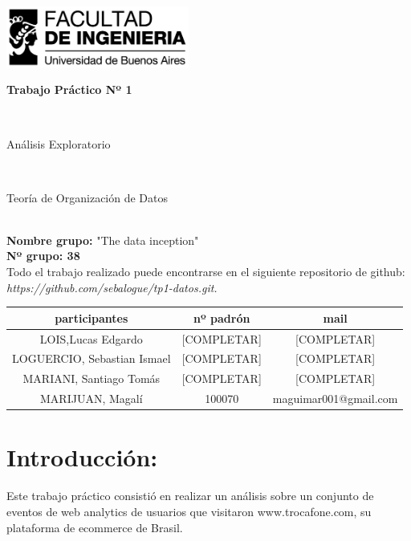 \documentclass[titlepage,a4paper]{article}
\begin{document}
	\begin{titlepage}
		\hfill\includegraphics[width=6cm]{logofiuba.jpg}
		\center
		\vfill
		\vfill
		\begin{center}
			\begin{Huge}\textbf{Trabajo Práctico Nº 1}\end{Huge}\\
			\vfill
			\begin{huge}Análisis Exploratorio\end{huge}\\
			\vfill
			\begin{Large} Teoría de Organización de Datos\end{Large}\\

			\textbf{Nombre grupo:} "The data inception" \\
			\textbf{Nº grupo: 38}\\
				Todo el trabajo realizado puede encontrarse en el siguiente repositorio de github:\textit{ https://github.com/sebalogue/tp1-datos.git. }
	
			\vfill
			\begin{tabular}{|c|c|c|}
				\hline
				participantes & nº padrón & mail \\ \hline
				LOIS,Lucas Edgardo &[COMPLETAR] &  [COMPLETAR] \\ \hline		
				LOGUERCIO, Sebastian Ismael &[COMPLETAR] &  [COMPLETAR] \\ \hline
				MARIANI, Santiago Tomás &[COMPLETAR] &  [COMPLETAR] \\ \hline
				MARIJUAN, Magalí & 100070 & maguimar001@gmail.com\\ \hline
				
			\end{tabular}
			\vfill
			\vfill
			\vfill
			\vfill
			\vfill
			\vfill
		\end{center}
	
	\end{titlepage}

	\tableofcontents
	\newpage
	
	\section{Introducción:}
	Este trabajo práctico consistió en realizar un análisis sobre un conjunto de eventos de web analytics de usuarios que visitaron www.trocafone.com, su plataforma de ecommerce de Brasil.
	
\end{document}
